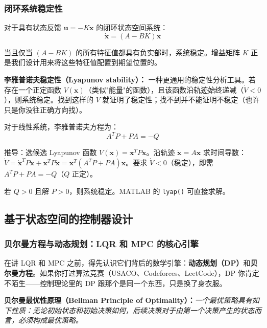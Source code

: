 \subsubsection{闭环系统稳定性}

对于具有状态反馈 $\mathbf{u} = -K\mathbf{x}$ 的闭环状态空间系统：
\begin{equation}
\dot{\mathbf{x}} = (A - BK)\mathbf{x}
\end{equation}

当且仅当 $(A - BK)$ 的所有特征值都具有负实部时，系统稳定。增益矩阵 $K$ 正是我们设计用来将这些特征值配置到期望位置的。

\textbf{李雅普诺夫稳定性（Lyapunov stability）：} 一种更通用的稳定性分析工具。若存在一个正定函数 $V(\mathbf{x})$（类似"能量"的函数），且该函数沿轨迹始终递减（$\dot{V} < 0$），则系统稳定。找到这样的 $V$ 就证明了稳定性；找不到并不能证明不稳定（也许只是你没往正确方向找）。

对于线性系统，李雅普诺夫方程为：
\begin{equation}
A^T P + PA = -Q
\end{equation}

推导：选候选 Lyapunov 函数 $V(\mathbf{x}) = \mathbf{x}^T P \mathbf{x}$。沿轨迹 $\dot{\mathbf{x}} = A\mathbf{x}$ 求时间导数：$\dot{V} = \dot{\mathbf{x}}^T P \mathbf{x} + \mathbf{x}^T P \dot{\mathbf{x}} = \mathbf{x}^T(A^T P + PA)\mathbf{x}$。要求 $\dot{V} < 0$（稳定），即需 $A^T P + PA = -Q$（$Q$ 正定）。

若 $Q > 0$ 且解 $P > 0$，则系统稳定。MATLAB 的 \texttt{lyap()} 可直接求解。

\subsection{基于状态空间的控制器设计}

\subsubsection{贝尔曼方程与动态规划：LQR 和 MPC 的核心引擎}

在讲 LQR 和 MPC 之前，得先认识它们背后的数学引擎：\textbf{动态规划（DP）}和\textbf{贝尔曼方程}。如果你打过算法竞赛（USACO、Codeforces、LeetCode），DP 你肯定不陌生——控制理论里的 DP 跟那个是同一个东西，只是换了身衣服。

\textbf{贝尔曼最优性原理（Bellman Principle of Optimality）：}\textit{一个最优策略具有如下性质：无论初始状态和初始决策如何，后续决策对于由第一个决策产生的状态而言，必须构成最优策略。}


